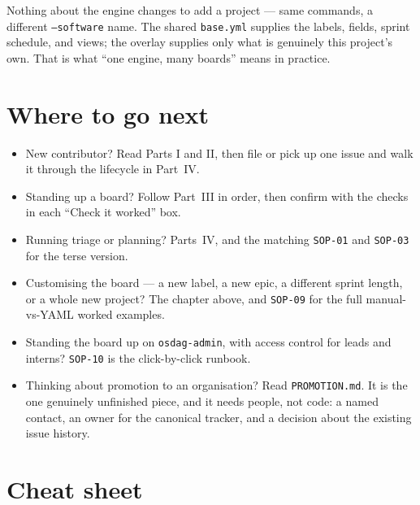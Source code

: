 \documentclass[11pt,a4paper]{report}
\newcommand{\code}[1]{\texttt{#1}}
\begin{document}
\begin{plainenglish}
Nothing about the engine changes to add a project --- same commands, a different
\code{--software} name. The shared \code{base.yml} supplies the labels, fields,
sprint schedule, and views; the overlay supplies only what is genuinely this
project's own. That is what ``one engine, many boards'' means in practice.
\end{plainenglish}

\chapter{Where to go next}

\begin{itemize}[leftmargin=1.4em,itemsep=3pt]
  \item New contributor? Read Parts I and II, then file or pick up one issue and walk
        it through the lifecycle in Part~IV.
  \item Standing up a board? Follow Part~III in order, then confirm with the checks
        in each ``Check it worked'' box.
  \item Running triage or planning? Parts~IV, and the matching \code{SOP-01} and
        \code{SOP-03} for the terse version.
  \item Customising the board --- a new label, a new epic, a different sprint
        length, or a whole new project? The chapter above, and \code{SOP-09} for
        the full manual-vs-YAML worked examples.
  \item Standing the board up on \code{osdag-admin}, with access control for leads
        and interns? \code{SOP-10} is the click-by-click runbook.
  \item Thinking about promotion to an organisation? Read \code{PROMOTION.md}. It is
        the one genuinely unfinished piece, and it needs people, not code: a named
        contact, an owner for the canonical tracker, and a decision about the
        existing issue history.
\end{itemize}

\chapter*{Cheat sheet}
\end{document}
